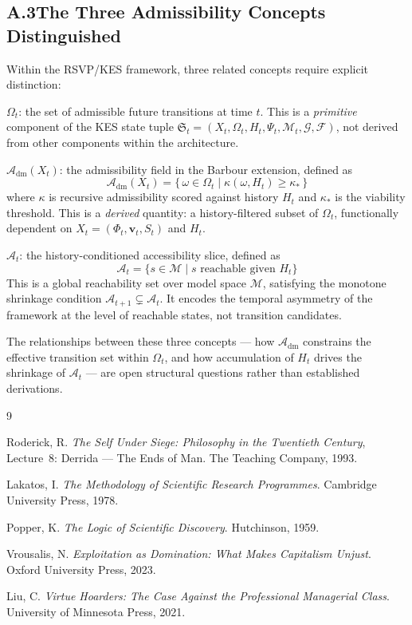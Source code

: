 \documentclass[12pt, a4paper]{article}
\begin{document}
\begin{appendices}
\subsection*{A.3\quad The Three Admissibility Concepts Distinguished}

Within the RSVP/KES framework, three related concepts require explicit distinction:

\medskip
\noindent $\Omega_t$: the set of admissible future transitions at time $t$. This is a \textit{primitive} component of the KES state tuple $\mathfrak{S}_t = (X_t, \Omega_t, H_t, \Psi_t, \mathcal{M}_t, \mathcal{G}, \mathcal{F})$, not derived from other components within the architecture.

\medskip
\noindent $\mathcal{A}_{\mathrm{dm}}(X_t)$: the admissibility field in the Barbour extension, defined as
\[
\mathcal{A}_{\mathrm{dm}}(X_t) = \bigl\{\,\omega \in \Omega_t \;\big|\; \kappa(\omega, H_t) \geq \kappa_*\,\bigr\}
\]
where $\kappa$ is recursive admissibility scored against history $H_t$ and $\kappa_*$ is the viability threshold. This is a \textit{derived} quantity: a history-filtered subset of $\Omega_t$, functionally dependent on $X_t = (\Phi_t, \mathbf{v}_t, S_t)$ and $H_t$.

\medskip
\noindent $\mathcal{A}_t$: the history-conditioned accessibility slice, defined as
\[
\mathcal{A}_t = \bigl\{s \in \mathcal{M} \mid s \text{ reachable given } H_t\bigr\}
\]
This is a global reachability set over model space $\mathcal{M}$, satisfying the monotone shrinkage condition $\mathcal{A}_{t+1} \subsetneq \mathcal{A}_t$. It encodes the temporal asymmetry of the framework at the level of reachable states, not transition candidates.

\medskip
\noindent The relationships between these three concepts --- how $\mathcal{A}_{\mathrm{dm}}$ constrains the effective transition set within $\Omega_t$, and how accumulation of $H_t$ drives the shrinkage of $\mathcal{A}_t$ --- are open structural questions rather than established derivations.

\end{appendices}

\begin{thebibliography}{9}

Roderick, R. \textit{The Self Under Siege: Philosophy in the Twentieth Century}, Lecture~8: Derrida --- The Ends of Man. The Teaching Company, 1993.

Lakatos, I. \textit{The Methodology of Scientific Research Programmes}. Cambridge University Press, 1978.

Popper, K. \textit{The Logic of Scientific Discovery}. Hutchinson, 1959.

Vrousalis, N. \textit{Exploitation as Domination: What Makes Capitalism Unjust}. Oxford University Press, 2023.

Liu, C. \textit{Virtue Hoarders: The Case Against the Professional Managerial Class}. University of Minnesota Press, 2021.

\end{thebibliography}
\end{document}
